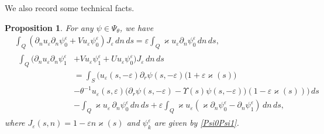 \documentclass[reqno]{amsart}
\theoremstyle{plain}
\newtheorem{prop}{Proposition}
\numberwithin{equation}{section}
\renewcommand{\kappa}{\varkappa}
\newcommand{\eps}{\varepsilon}
\begin{document}
We also record some technical facts.
\begin{prop}\label{PropIntomegaEps}
For any $\psi\in \Psi_\theta$, we have
  \begin{align}\label{IntInLocal1}
   &\int_Q (\partial_n u_\eps \partial_n \psi_0^\eps+Vu_\eps \psi_0^\eps)J_\eps\,dn\,ds=\eps \int_Q \kappa u_\eps \partial_n\psi_0^\eps\,dn\,ds,
    \\
   &\begin{aligned}\label{IntInLocal2}
    \int_Q (\partial_n u_\eps\partial_n \psi_1^\eps&+Vu_\eps \psi_1^\eps+Uu_\eps \psi_0^\eps)J_\eps\,dn\,ds
    \\
    &=\int_S \Big(u_\eps(s,-\eps)\partial_r \psi(s,-\eps)\big(1+\eps \kappa(s)\big)
    \\
    &-
    \theta^{-1}u_\eps(s,\eps)\big(\partial_r\psi(s,-\eps)-\Upsilon(s)\psi(s,-\eps)\big)(1-\eps \kappa(s))\Big)\,ds
    \\
&-\int_Q \kappa u_\eps\, \partial_n\psi_0^\eps\,dn\,ds+
\eps\int_Q \kappa u_\eps (\kappa \partial_n\psi_0^\eps- \partial_n \psi_1^\eps)\,dn\,ds,
    \end{aligned}
  \end{align}
where $J_\eps(s,n)=1-\eps n \kappa(s)$ and $\psi_k^\eps$ are given by \eqref{Psi0Psi1}.
\end{prop}
\end{document}
